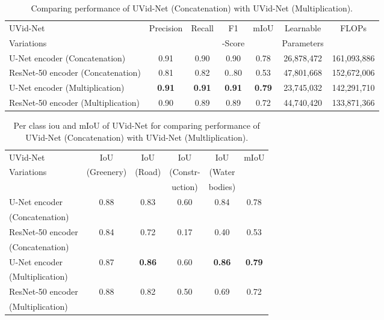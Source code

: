 \documentclass[journal]{IEEEtran}
\begin{document}
\begin{table*}[!h]
	\begin{center}
		\begin{tabular}{|l|c|c|c|c|c|c|}
			\hline
		UVid-Net & Precision&Recall&F1 &mIoU & Learnable&FLOPs \\
		Variations&&&-Score&&Parameters&\\
			\hline\hline
			U-Net encoder (Concatenation) &0.91	&0.90	&0.90	&0.78&26,878,472&161,093,886\\

			\hline
		ResNet-50 encoder (Concatenation) &	0.81 &	0.82&0..80	& 0.53 &47,801,668& 152,672,006\\
			
			\hline
			U-Net encoder (Multiplication)&\textbf{0.91}&	\textbf{0.91}&	\textbf{0.91}&		\textbf{0.79}&23,745,032&142,291,710\\
			
			\hline
			ResNet-50 encoder (Multiplication)&0.90	&0.89	&0.89	&0.72&44,740,420&133,871,366\\
			
			\hline
	
		\end{tabular}
	\end{center}
	\caption{Comparing performance of UVid-Net (Concatenation) with UVid-Net (Multiplication).}
	\label{table3}
\end{table*}
\begin{table}[!h]
	\begin{center}
		\begin{tabular}{|l|c|c|c|c|c|}
			\hline
			UVid-Net & IoU &IoU &IoU&IoU&mIoU \\
			Variations&(Greenery)&(Road)&(Constr-& (Water &\\
			&          &      & uction)              &bodies)&\\
			\hline
			\hline
	    	U-Net encoder&0.88 &	0.83 &	0.60 &	0.84 &0.78\\
	    	(Concatenation)&&&&&\\
			\hline
	    	ResNet-50 encoder&0.84 &	0.72 &	0.17 &	0.40 &0.53\\
	    	(Concatenation)&&&&&\\
			\hline
			U-Net encoder& 0.87 &	\textbf{0.86} &	0.60 &\textbf{0.86} &	\textbf{0.79}\\
			(Multiplication)&&&&&\\
			\hline
		
		ResNet-50 encoder&0.88	&0.82	&	0.50&0.69	&0.72\\
		(Multiplication)&&&&&\\
		\hline
		\end{tabular}
	\end{center}
	\caption{Per class iou and mIoU of UVid-Net for comparing performance of UVid-Net (Concatenation) with UVid-Net (Multliplication).}
	\label{table4}
\end{table}
\end{document}
